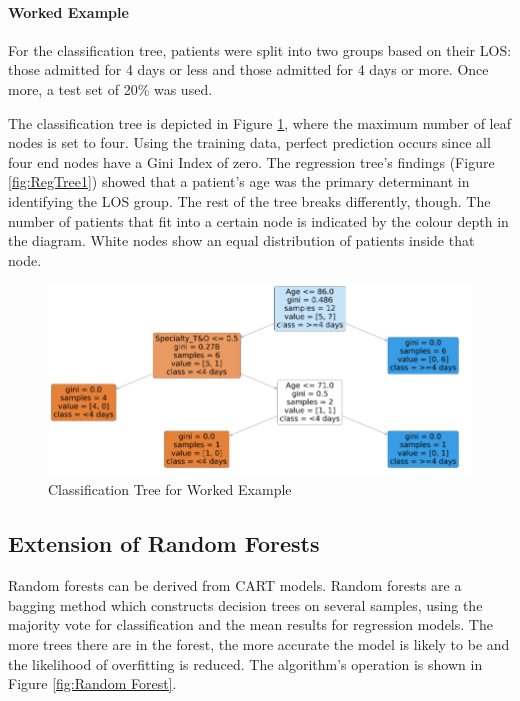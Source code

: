 \documentclass[../thesis.tex]{subfiles}
\begin{document}
\paragraph{Worked Example}
For the classification tree, patients were split into two groups based on their LOS: those admitted for 4 days or less and those admitted for 4 days or more. Once more, a test set of 20\% was used.

The classification tree is depicted in Figure \ref{fig:classificationtreeExample}, where the maximum number of leaf nodes is set to four. Using the training data, perfect prediction occurs since all four end nodes have a Gini Index of zero. The regression tree's findings (Figure \ref{fig:RegTree1}) showed that a patient's age was the primary determinant in identifying the LOS group. The rest of the tree breaks differently, though. The number of patients that fit into a certain node is indicated by the colour depth in the diagram. White nodes show an equal distribution of patients inside that node.

\begin{figure}[h!]
    \centering
    \includegraphics[scale = 0.8]{Chapters/Chapter3New/Figures/classificationtreeexample.png}
    \caption{Classification Tree for Worked Example}
    \label{fig:classificationtreeExample}
\end{figure}



\subsection{Extension of Random Forests}\label{sec:randomforest}
Random forests can be derived from CART models. Random forests are a bagging method which constructs decision trees on several samples, using the majority vote for classification and the mean results for regression models. The more trees there are in the forest, the more accurate the model is likely to be and the likelihood of overfitting is reduced. The algorithm's operation is shown in Figure \ref{fig:Random Forest}.
\end{document}
